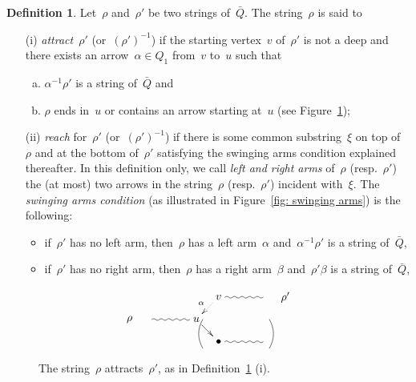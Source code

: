 \documentclass{amsart}
\theoremstyle{definition}
\newtheorem{definition}[theorem]{Definition}
\newcommand{\darkblue}{\color{darkblue}} %
\newcommand{\defn}[1]{\textsl{\darkblue #1}} %
\begin{document}
\begin{definition}
\label{definition: dance and attract}
Let~$\rho$ and~$\rho'$ be two strings of~$\bar Q$. The string~$\rho$ is said to
\begin{itemize}
\item[(i)] \defn{attract}~$\rho'$ (or~$(\rho')^{-1}$) if the starting vertex~$v$ of~$\rho'$ is not a deep and there exists an arrow~$\alpha \in Q_1$ from~$v$ to~$u$ such that
	\begin{enumerate}[(a)]
	\item $\alpha^{-1}\rho'$ is a string of~$\bar Q$ and
	\item $\rho$ ends in~$u$ or contains an arrow starting at~$u$ (see Figure~\ref{fig:def-attracts});
	\end{enumerate}
\item[(ii)] \defn{reach} for~$\rho'$ (or~$(\rho')^{-1}$) if there is some common substring~$\xi$ on top of~$\rho$ and at the bottom of~$\rho'$ satisfying the swinging arms condition explained thereafter. In this definition only, we call \defn{left and right arms} of~$\rho$ (resp.~$\rho'$) the (at most) two arrows in the string~$\rho$ (resp.~$\rho'$) incident with~$\xi$. The \defn{swinging arms condition} (as illustrated in Figure~\ref{fig: swinging arms}) is the following: 
\begin{itemize}
\item if~$\rho'$ has no left arm, then~$\rho$ has a left arm~$\alpha$ and~$\alpha^{-1}\rho'$ is a string of~$\bar Q$,
\item if~$\rho'$ has no right arm, then~$\rho$ has a right arm~$\beta$ and~$\rho'\beta$ is a string of~$\bar Q$,
\end{itemize}
\end{itemize}
\begin{figure}[t]
 	\capstart
\[
\xy
%
(28,7)*+{v}="14";
(42,7)="16";
(49,7)*+{\rho'}="17";
%
(0,0)*+{\rho}="0";
(7,0)="1";
(21,0)*+{u}="3";
%
(28,-7)*+{\bullet}="-4";
(42,-7)="-6";
%
{\ar@{~} "1";"3"};
{\ar "3";"-4"};
{\ar@{~} "-4";"-6"};
%
{\ar@{~} "14";"16"};
%
{\ar@{..>}_{\alpha} "14";"3"};
%
{\ar@/_.3pc/@{-} (23,0);(23,-9)};
{\ar@/^.3pc/@{-} (44,0);(44,-9)};
%
\endxy
\]
	\caption{The string~$\rho$ attracts~$\rho'$, as in Definition~\ref{definition: dance and attract} (i).}
	\label{fig:def-attracts}
\end{figure}


\end{definition}
\end{document}
